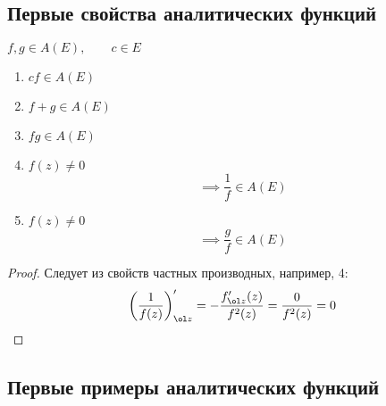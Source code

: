 \subsection{Первые свойства аналитических функций}

\begin{properties}
	$ f, g \in A(E), \qquad c \in E $
	\begin{enumerate}
		\item $ cf \in A(E) $
		\item $ f + g \in A(E) $
		\item $ fg \in A(E) $
		\item $ f(z) \ne 0 $
		$$ \implies \frac1f \in A(E) $$
		\item $ f(z) \ne 0 $
		$$ \implies \frac gf \in A(E) $$
	\end{enumerate}
\end{properties}

\begin{proof}
	Следует из свойств частных производных, например, 4:
	$$ \bigg( \frac1{f(z)} \bigg)_{\ol z}' = -\frac{f_{\ol z}'(z)}{f^2(z)} = \frac 0{f^2(z)} = 0 $$
\end{proof}

\subsection{Первые примеры аналитических функций}

